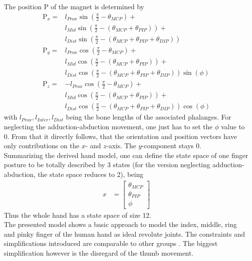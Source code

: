 The position $ \mathrm{P} $ of the magnet is determined by
\begin{equation}\label{eq:posX}
\begin{aligned}
\mathrm{P}_{x} =& l_{Prox}\sin(\frac{\pi}{2}-\theta_{MCP}) +\\
& l_{Mid}\sin(\frac{\pi}{2}-(\theta_{MCP}+\theta_{PIP})) +\\
& l_{Dist}\sin(\frac{\pi}{2}-(\theta_{MCP}+\theta_{PIP}+\theta_{DIP})) \\[4pt]
\mathrm{P}_{y} =& l_{Prox}\cos(\frac{\pi}{2}-\theta_{MCP}) +\\
& l_{Mid}\cos(\frac{\pi}{2}-(\theta_{MCP}+\theta_{PIP})) +\\
& l_{Dist}\cos(\frac{\pi}{2}-(\theta_{MCP}+\theta_{PIP}+\theta_{DIP}))\sin(\phi) \\[4pt]
\mathrm{P}_{z} =& -l_{Prox}\cos(\frac{\pi}{2}-\theta_{MCP}) +\\
& l_{Mid}\cos(\frac{\pi}{2}-(\theta_{MCP}+\theta_{PIP})) +\\
& l_{Dist}\cos(\frac{\pi}{2}-(\theta_{MCP}+\theta_{PIP}+\theta_{DIP}))\cos(\phi)
\end{aligned}
\end{equation}
with $ l_{Prox}, l_{Inter}, l_{Dist} $ being the bone lengths of the associated phalanges. For neglecting the adduction-abduction movement, one just has to set the $ \phi $ value to 0. From that it directly follows, that the orientation and position vectors have only contributions on the $ x $- and $ z $-axis. The $ y $-component stays 0.\\
Summarizing the derived hand model, one can define the state space of one finger posture to be totally described by 3 states (for the version neglecting adduction-abduction, the state space reduces to 2), being
\begin{equation*}
\begin{aligned}
x &= \begin{bmatrix}
				\theta_{MCP}\\
				\theta_{PIP}\\
				\phi
\end{bmatrix}
\end{aligned}
\end{equation*}
Thus the whole hand has a state space of size 12.\\
The presented model shows a basic approach to model the index, middle, ring and pinky finger of the human hand as ideal revolute joints. The constraints and simplifications introduced are comparable to other groups \cite{lin2000modeling}. The biggest simplification however is the disregard of the thumb movement.



